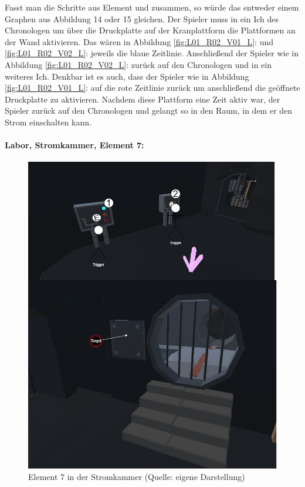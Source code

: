 Fasst man die Schritte aus Element  und  zusammen, so würde das entweder einem Graphen aus Abbildung 14 oder 15 gleichen. Der Spieler muss in ein Ich des Chronologen  um über die Druckplatte auf der Kranplattform die Plattformen an der Wand aktivieren. Das wären in Abbildung \ref{fig:L01_R02_V01_L}:  und \ref{fig:L01_R02_V02_L}:  jeweils die blaue Zeitlinie. Anschließend  der Spieler wie in Abbildung \ref{fig:L01_R02_V02_L}:  zurück auf den Chronologen und  in ein weiteres Ich. Denkbar ist es auch, dass der Spieler wie in Abbildung \ref{fig:L01_R02_V01_L}:  auf die rote Zeitlinie zurück  um anschließend die geöffnete Druckplatte zu aktivieren. Nachdem diese Plattform eine Zeit aktiv war,  der Spieler zurück auf den Chronologen und gelangt so in den Raum, in dem er den Strom einschalten kann.

\paragraph{Labor, Stromkammer, Element 7:}\label{p:lse7}

\begin{figure}[ht]
\centering
\includegraphics[width=0.8\linewidth]{content/pictures/Raetsel-L02_R01_R07.jpg}
\caption{Element 7 in der Stromkammer (Quelle: eigene Darstellung)}
\label{fig:L02_R01_R07}
\end{figure}

